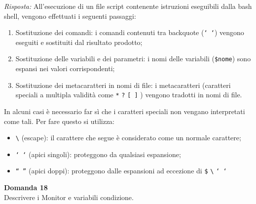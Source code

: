 \documentclass{article}
\newenvironment{problem}[2][Domanda]
    { \begin{mdframed}[backgroundcolor=gray!20] \textbf{#1 #2} \\}
    {  \end{mdframed}}
\newenvironment{solution}
    {\textit{Risposta:}}
    {}
\begin{document}
\begin{solution}
All’esecuzione di un file script contenente istruzioni eseguibili dalla bash shell, vengono effettuati i seguenti passaggi:
\begin{enumerate}
    \item Sostituzione dei comandi: i comandi contenuti tra backquote (\texttt{` `}) vengono eseguiti e sostituiti dal risultato prodotto;
    \item Sostituzione delle variabili e dei parametri: i nomi delle variabili (\texttt{\$nome}) sono espansi nei valori corrispondenti;
    \item  Sostituzione dei metacaratteri in nomi di file: i metacaratteri (caratteri speciali a multipla validità come \texttt{*}  \texttt{?}  \texttt{[ ]} ) vengono tradotti in nomi di file.
\end{enumerate}
In alcuni casi è necessario far sì che i caratteri speciali non vengano interpretati come tali. Per fare questo si utilizza:
\begin{itemize}
    \item \texttt{\textbackslash} (escape): il carattere che segue è considerato come un normale carattere;
    \item \texttt{‘ ‘} (apici singoli): proteggono da qualsiasi espansione;
    \item \texttt{“ ”} (apici doppi): proteggono dalle espansioni ad eccezione di \texttt{\$} \texttt{\textbackslash} \texttt{` `}
\end{itemize}
\end{solution}
\begin{problem}{18}
Descrivere i Monitor e variabili condizione.
\end{problem}
\end{document}
